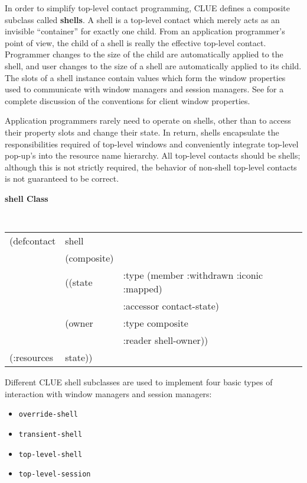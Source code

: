 In order to simplify top-level contact programming, CLUE defines a composite
subclass called {\bf shells}.  A shell is a top-level contact which
merely acts as an invisible ``container'' for exactly one child.  From an
application programmer's point of view, the child of a shell is really the
effective top-level contact.  Programmer changes to the size of the child are
automatically applied to the shell, and user changes to the size of a shell are
automatically applied to its child.  The slots of a shell instance contain
values which form the window properties used to communicate with window managers
and session managers.  See \cite{icccm} for a complete discussion of the
conventions for client window properties.

Application programmers rarely need to operate on shells, other than to access
their property slots and change their state.  In return, shells encapsulate the
responsibilities required of top-level windows and conveniently integrate
top-level pop-up's into the resource name hierarchy.  All top-level contacts
should be shells; although this is not strictly required, the behavior of
non-shell top-level contacts is not guaranteed to be correct.

\pagebreak
{\samepage 
{\large {\bf shell \hfill Class}} 
\begin{flushright} \parbox[t]{6.125in}{
\tt
\begin{tabular}{lll}
\raggedright
(defcontact & shell  & \\ 
& (composite) & \\
& ((state     &  :type (member :withdrawn :iconic :mapped)\\
&	      &  :accessor contact-state) \\  
&  (owner     &  :type     composite\\
&	      & :reader   shell-owner))\\
(:resources & state))

\end{tabular}
\rm

}\end{flushright}}

Different CLUE shell subclasses are used to implement four basic types
of interaction with window managers and session managers:

\begin{itemize}
\item {\tt override-shell}
\item {\tt transient-shell}
\item {\tt top-level-shell}
\item {\tt top-level-session}
\end{itemize}



